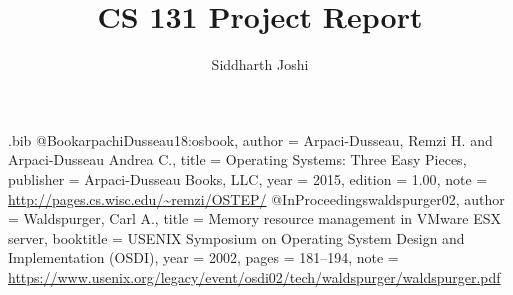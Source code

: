 \usepackage{filecontents}

\begin{filecontents}{\jobname.bib}
@Book{arpachiDusseau18:osbook,
  author =       {Arpaci-Dusseau, Remzi H. and Arpaci-Dusseau Andrea C.},
  title =        {Operating Systems: Three Easy Pieces},
  publisher =    {Arpaci-Dusseau Books, LLC},
  year =         2015,
  edition =      {1.00},
  note =         {\url{http://pages.cs.wisc.edu/~remzi/OSTEP/}}
}
@InProceedings{waldspurger02,
  author =       {Waldspurger, Carl A.},
  title =        {Memory resource management in {VMware ESX} server},
  booktitle =    {USENIX Symposium on Operating System Design and
                  Implementation (OSDI)},
  year =         2002,
  pages =        {181--194},
  note =         {\url{https://www.usenix.org/legacy/event/osdi02/tech/waldspurger/waldspurger.pdf}}}
\end{filecontents}



\date{}

\title{\Large \bf CS 131 Project Report}

\author{
{\rm Siddharth Joshi}\\
} %

\maketitle

